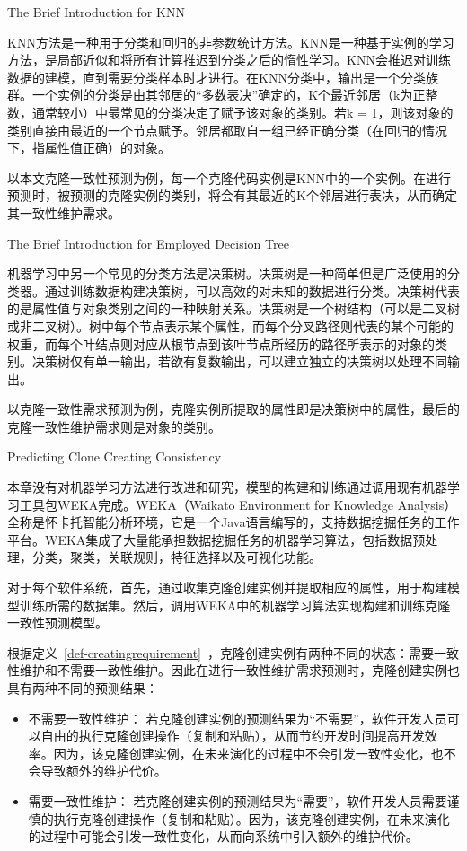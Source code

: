 {The Brief Introduction for KNN}

KNN方法是一种用于分类和回归的非参数统计方法。KNN是一种基于实例的学习方法，是局部近似和将所有计算推迟到分类之后的惰性学习。KNN会推迟对训练数据的建模，直到需要分类样本时才进行。在KNN分类中，输出是一个分类族群。一个实例的分类是由其邻居的“多数表决”确定的，K个最近邻居（k为正整数，通常较小）中最常见的分类决定了赋予该对象的类别。若k = 1，则该对象的类别直接由最近的一个节点赋予。邻居都取自一组已经正确分类（在回归的情况下，指属性值正确）的对象。

以本文克隆一致性预测为例，每一个克隆代码实例是KNN中的一个实例。在进行预测时，被预测的克隆实例的类别，将会有其最近的K个邻居进行表决，从而确定其一致性维护需求。

{The Brief Introduction for Employed Decision Tree}

机器学习中另一个常见的分类方法是决策树。决策树是一种简单但是广泛使用的分类器。通过训练数据构建决策树，可以高效的对未知的数据进行分类。决策树代表的是属性值与对象类别之间的一种映射关系。决策树是一个树结构（可以是二叉树或非二叉树）。树中每个节点表示某个属性，而每个分叉路径则代表的某个可能的权重，而每个叶结点则对应从根节点到该叶节点所经历的路径所表示的对象的类别。决策树仅有单一输出，若欲有复数输出，可以建立独立的决策树以处理不同输出。

 以克隆一致性需求预测为例，克隆实例所提取的属性即是决策树中的属性，最后的克隆一致性维护需求则是对象的类别。


{Predicting Clone Creating Consistency}

本章没有对机器学习方法进行改进和研究，模型的构建和训练通过调用现有机器学习工具包WEKA完成。WEKA（Waikato Environment for Knowledge Analysis）全称是怀卡托智能分析环境，它是一个Java语言编写的，支持数据挖掘任务的工作平台。WEKA集成了大量能承担数据挖掘任务的机器学习算法，包括数据预处理，分类，聚类，关联规则，特征选择以及可视化功能。

对于每个软件系统，首先，通过收集克隆创建实例并提取相应的属性，用于构建模型训练所需的数据集。然后，调用WEKA中的机器学习算法实现构建和训练克隆一致性预测模型。

根据定义~\ref{def-creatingrequirement}~，克隆创建实例有两种不同的状态：需要一致性维护和不需要一致性维护。因此在进行一致性维护需求预测时，克隆创建实例也具有两种不同的预测结果：

\begin{itemize}
\item 
不需要一致性维护：
若克隆创建实例的预测结果为“不需要”，软件开发人员可以自由的执行克隆创建操作（复制和粘贴），从而节约开发时间提高开发效率。因为，该克隆创建实例，在未来演化的过程中不会引发一致性变化，也不会导致额外的维护代价。
\item
需要一致性维护：
若克隆创建实例的预测结果为“需要”，软件开发人员需要谨慎的执行克隆创建操作（复制和粘贴）。因为，该克隆创建实例，在未来演化的过程中可能会引发一致性变化，从而向系统中引入额外的维护代价。
\end{itemize}

